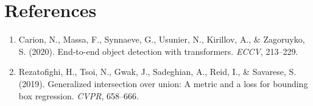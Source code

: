 \documentclass[11pt,a4paper]{article}
\theoremstyle{definition}
\begin{document}
\section{References}
\begin{enumerate}
    \item Carion, N., Massa, F., Synnaeve, G., Usunier, N., Kirillov, A., \& Zagoruyko, S. (2020). End-to-end object detection with transformers. \emph{ECCV}, 213--229.
    \item Rezatofighi, H., Tsoi, N., Gwak, J., Sadeghian, A., Reid, I., \& Savarese, S. (2019). Generalized intersection over union: A metric and a loss for bounding box regression. \emph{CVPR}, 658--666.
\end{enumerate}
\end{document}
